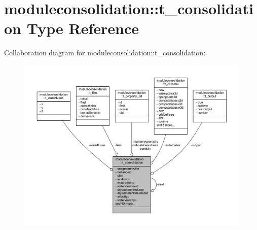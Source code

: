 \hypertarget{structmoduleconsolidation_1_1t__consolidation}{}\section{moduleconsolidation\+:\+:t\+\_\+consolidation Type Reference}
\label{structmoduleconsolidation_1_1t__consolidation}


Collaboration diagram for moduleconsolidation\+:\+:t\+\_\+consolidation\+:\nopagebreak
\begin{figure}[H]
\begin{center}
\leavevmode
\includegraphics[width=350pt]{structmoduleconsolidation_1_1t__consolidation__coll__graph}
\end{center}
\end{figure}
